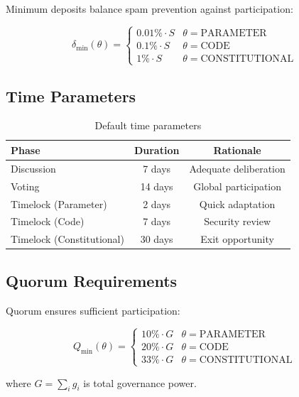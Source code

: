 \documentclass[11pt,a4paper]{article}
\theoremstyle{definition}
\theoremstyle{remark}
\begin{document}
Minimum deposits balance spam prevention against participation:

\begin{equation}
    \delta_{\min}(\theta) = \begin{cases}
        0.01\% \cdot S & \theta = \text{PARAMETER} \\
        0.1\% \cdot S & \theta = \text{CODE} \\
        1\% \cdot S & \theta = \text{CONSTITUTIONAL}
    \end{cases}
\end{equation}

\subsection{Time Parameters}

\begin{table}[h]
\centering
\begin{tabular}{lcc}
\toprule
Phase & Duration & Rationale \\
\midrule
Discussion & 7 days & Adequate deliberation \\
Voting & 14 days & Global participation \\
Timelock (Parameter) & 2 days & Quick adaptation \\
Timelock (Code) & 7 days & Security review \\
Timelock (Constitutional) & 30 days & Exit opportunity \\
\bottomrule
\end{tabular}
\caption{Default time parameters}
\end{table}

\subsection{Quorum Requirements}

Quorum ensures sufficient participation:

\begin{equation}
    Q_{\min}(\theta) = \begin{cases}
        10\% \cdot G & \theta = \text{PARAMETER} \\
        20\% \cdot G & \theta = \text{CODE} \\
        33\% \cdot G & \theta = \text{CONSTITUTIONAL}
    \end{cases}
\end{equation}

where $G = \sum_i g_i$ is total governance power.
\end{document}
